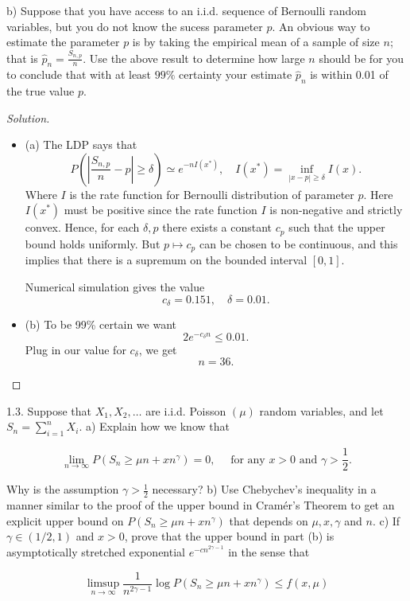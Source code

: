 b) Suppose that you have access to an i.i.d. sequence of Bernoulli random variables, but you do not know the sucess parameter $p$. An obvious way to estimate the parameter $p$ is by taking the empirical mean of a sample of size $n$; that is $\hat{p}_n=\frac{S_{n, p}}{n}$. Use the above result to determine how large $n$ should be for you to conclude that with at least $99 \%$ certainty your estimate $\hat{p}_n$ is within 0.01 of the true value $p$.

\begin{proof}[Solution]
	\begin{itemize}
		\item (a) The LDP says that
			\[
				P\left( \left| \frac{S_{n, p}}{n} - p \right|  \ge \delta \right) \simeq e^{- n I(x^*)}, \quad
				I(x^*) = \inf_{|x - p| \ge \delta} I(x)
			.\] 
			Where $I$ is the rate function for Bernoulli distribution of parameter $p$.
			Here $I(x^*)$ must be positive since the rate function $I$ is non-negative and strictly convex.
			Hence, for each $\delta, p$ there exists a constant $c_p$ such that the upper bound holds uniformly. But $p \mapsto c_p$ can be chosen to be continuous, and this implies that there is a supremum on the bounded interval $[0,1]$.

			Numerical simulation gives the value
			\[
				c_\delta = 0.151, \quad \delta = 0.01
			.\] 
		\item (b) To be 99\% certain we want 
			\[
				2 e ^{- c_\delta n} \le 0.01
			.\] 
			Plug in our value for $c_\delta$, we get
			\[
				n = 36
			.\] 
	\end{itemize}	
\end{proof}

1.3. Suppose that $X_1, X_2, \ldots$ are i.i.d. Poisson $(\mu)$ random variables, and let $S_n=\sum_{i=1}^n X_i$.
a) Explain how we know that

\[
\lim _{n \rightarrow \infty} P\left(S_n \geq \mu n+x n^\gamma\right)=0, \quad \text { for any } x>0 \text { and } \gamma>\frac{1}{2} .
\]


Why is the assumption $\gamma>\frac{1}{2}$ necessary?
b) Use Chebychev's inequality in a manner similar to the proof of the upper bound in Cramér's Theorem to get an explicit upper bound on $P\left(S_n \geq \mu n+x n^\gamma\right)$ that depends on $\mu, x, \gamma$ and $n$.
c) If $\gamma \in(1 / 2,1)$ and $x>0$, prove that the upper bound in part (b) is asymptotically stretched exponential $e^{-c n^{2 \gamma-1}}$ in the sense that

\[
\limsup _{n \rightarrow \infty} \frac{1}{n^{2 \gamma-1}} \log P\left(S_n \geq \mu n+x n^\gamma\right) \leq f(x, \mu)
\]

